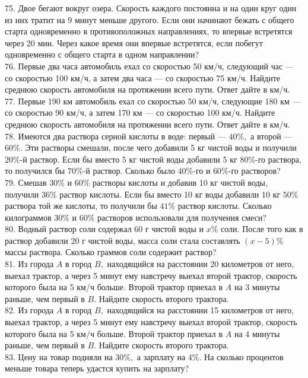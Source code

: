 \documentclass[12pt]{article}
\begin{document}
75. Двое бегают вокруг озера. Скорость каждого постоянна и на один круг один из них тратит на 9 минут меньше другого. Если они начинают бежать с общего старта одновременно в противоположных направлениях, то впервые встретятся через 20 мин. Через какое время они впервые встретятся, если побегут одновременно с общего старта в одном направлении?\\
76. Первые два часа автомобиль ехал со скоростью 50 км/ч, следующий час --- со скоростью 100 км/ч, а затем два часа --- со скоростью 75 км/ч. Найдите среднюю скорость автомобиля на протяжении всего пути. Ответ дайте в км/ч.\\
77. Первые 190 км автомобиль ехал со скоростью 50 км/ч, следующие 180 км --- со скоростью 90 км/ч, а затем 170 км --- со скоростью 100 км/ч. Найдите среднюю скорость автомобиля на протяжении всего пути. Ответ дайте в км/ч.\\
78. Имеются два раствора серной кислоты в воде: первый --- $40\%,$ а второй --- $60\%.$ Эти растворы смешали, после чего добавили 5 кг чистой воды и получили $20\%$-й раствор. Если бы вместо 5 кг чистой воды добавили 5 кг $80\%$-го раствора, то получился бы $70\%$-й раствор. Сколько было $40\%$-го и $60\%$-го растворов?\\
79. Смешав $30\%$ и $60\%$ растворы кислоты и добавив 10 кг чистой воды, получили $36\%$ раствор кислоты. Если бы вместо 10 кг воды добавили 10 кг $50\%$ раствора той же кислоты, то получили бы $41\%$ раствор кислоты. Сколько килограммов $30\%$ и $60\%$ растворов использовали для получения смеси?\\
80. Водный раствор соли содержал 60 г чистой воды и $x\%$ соли. После того как в раствор добавили 20 г чистой воды, масса соли стала составлять $(x-5)\%$ массы раствора. Сколько граммов соли содержит раствор?\\
81. Из города $A$ в город $B,$ находящийся на расстоянии 20 километров от него, выехал трактор,
а через 5 минут ему навстречу выехал второй трактор, скорость которого была на 5 км/ч больше. Второй трактор приехал в $A$
на 3 минуты раньше, чем первый в $B.$ Найдите скорость второго трактора.\\
82. Из города $A$ в город $B,$ находящийся на расстоянии 15 километров от него, выехал трактор,
а через 5 минут ему навстречу выехал второй трактор, скорость которого была на 5 км/ч больше. Второй трактор приехал в $A$
на 4 минуты раньше, чем первый в $B.$ Найдите скорость второго трактора.\\
83. Цену на товар подняли на $30\%,$ а зарплату на $4\%.$ На сколько процентов меньше товара теперь удастся купить на зарплату?\\
\end{document}
